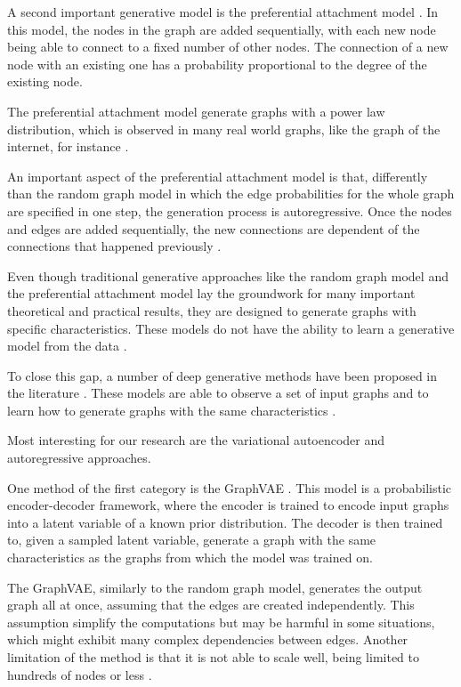 \documentclass[12pt,a4paper]{article}
\begin{document}
	A second important generative model is the preferential attachment model \citep{AlbertandBarabási2002}. In this model, the nodes in the graph are added sequentially, with each new node being able to connect to a fixed number of other nodes. The connection of a new node with an existing one has a probability proportional to the degree of the existing node.

	The preferential attachment model generate graphs with a power law distribution, which is observed in many real world graphs, like the graph of the internet, for instance \citep{Newman2019}.

	An important aspect of the preferential attachment model is that, differently than the random graph model in which the edge probabilities for the whole graph are specified in one step, the generation process is autoregressive. Once the nodes and edges are added sequentially, the new connections are dependent of the connections that happened previously \citep{Hamilton2020}.

	Even though traditional generative approaches like the random graph model and the preferential attachment model lay the groundwork for many important theoretical and practical results, they are designed to generate graphs with specific characteristics. These models do not have the ability to learn a generative model from the data \citep{Hamilton2020}.

	To close this gap, a number of deep generative methods have been proposed in the literature \citep{KipfandWelling2016, SimonovskyandKomodakis2018, DeCao2018, Li2018, You2018, Liao2019}. These models are able to observe a set of input graphs and to learn how to generate graphs with the same characteristics \citep{Hamilton2020}.

	Most interesting for our research are the variational autoencoder \citep{KipfandWelling2016, SimonovskyandKomodakis2018} and autoregressive \citep{Li2018, You2018, Liao2019} approaches.

	One method of the first category is the GraphVAE \citep{SimonovskyandKomodakis2018}. This model is a probabilistic encoder-decoder framework, where the encoder is trained to encode input graphs into a latent variable of a known prior distribution. The decoder is then trained to, given a sampled latent variable, generate a graph with the same characteristics as the graphs from which the model was trained on.

	The GraphVAE, similarly to the random graph model, generates the output graph all at once, assuming that the edges are created independently. This assumption simplify the computations but may be harmful in some situations, which might exhibit many complex dependencies between edges. Another limitation of the method is that it is not able to scale well, being limited to hundreds of nodes or less  \citep{Hamilton2020}.
\end{document}
